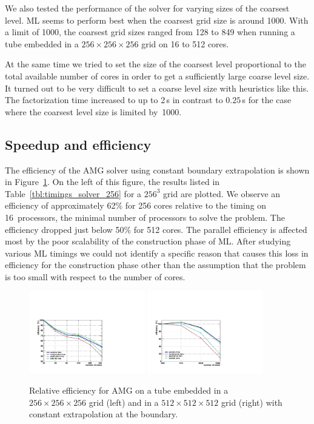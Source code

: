 \documentclass[a4paper,10pt,3p,final,pdftex]{elsarticle}
\begin{document}
We also tested the performance of the solver for varying sizes of the
coarsest level.  ML seems to perform best when the coarsest grid size is
around 1000.  With a limit of 1000, the coarsest grid sizes ranged from
128 to 849 when running a tube embedded in a $256 \times 256 \times 256$
grid on 16 to 512 cores.

At the same time we tried to set the size of the coarsest level
proportional to the total available number of cores in order to get a
sufficiently large coarse level size.  It turned out to be very difficult
to set a coarse level size with heuristics like this.  The factorization
time increased to up to 2\,s in contrast to $0.25$\,s for the case where
the coarsest level size is limited by~1000.


\subsection{Speedup and efficiency}

The efficiency of the AMG solver using constant boundary extrapolation
is shown in Figure~\ref{fig:speedup}.  On the left of this figure, the
results listed in Table~\ref{tbl:timings_solver_256} for a $256^3$ grid
are plotted.  We observe an efficiency of approximately 62\% for 256
cores relative to the timing on 16~processors, the minimal number of
processors to solve the problem.  The efficiency dropped just below 50\%
for 512 cores.  The parallel efficiency is affected most by the poor
scalability of the construction phase of ML.  After studying various ML
timings we could not identify a specific reason that causes this loss in
efficiency for the construction phase other than the assumption that the
problem is too small with respect to the number of cores.

\begin{figure}[htb] 
  \begin{center}
    \includegraphics[width=0.45\textwidth]{eff_256.pdf}
    \includegraphics[width=0.45\textwidth]{eff_512.pdf}
    \caption{Relative efficiency for AMG on a tube embedded in a
      $256\times256\times256$ grid (left) and in a
      $512\times512\times512$ grid (right) with constant extrapolation
      at the boundary.}
    \label{fig:speedup}
  \end{center} 
\end{figure}
\end{document}

